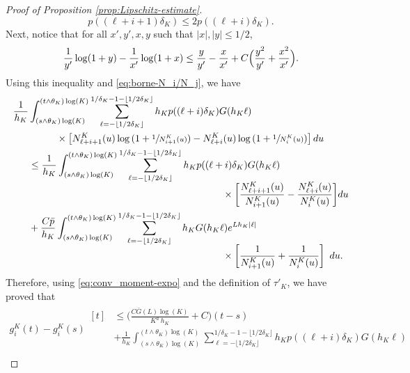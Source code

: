 \documentclass[JEP,XML,SOM,Unicode,published]{cedram}
\theoremstyle{plain}
\theoremstyle{remark}
\begin{document}
\begin{proof}[Proof of Proposition \ref{prop:Lipschitz-estimate}]
\[
p((\ell+i+1)\delta_K)\leq 2p((\ell+i)\delta_K).
\]
Next, notice that for all {$x',y',x,y$ such that $|x|,|y|\leq 1/2$,\vspace*{-3pt}
\begin{equation*}%
{1 \over y'}\log(1+{ y}) -{ 1\over x'}\log(1+{ x}) \le {y\over y'} - {x\over x'} + C\Big({y^2\over y'}+{x^2\over x'}\Big).
\end{equation*}
Using this inequality and \eqref{eq:borne-N_i/N_j}, we have\vspace*{-3pt}
\begin{align*}
\frac{1}{h_K} & \int_{(s\wedge\theta_K)\log(K)}^{(t\wedge\theta_K)\log(K)} \sum_{\ell=-\lfloor 1/2\delta_K\rfloor}^{1/\delta_K-1-\lfloor 1/2\delta_K\rfloor} h_{K} p((\ell+i)\delta_K) G(h_{K}\ell)\\
& \hspace{1cm} \times \left[N_{\ell+i+1}^K(u)\log \left(1+\sfrac{1}{N_{i+1}^K(u)}\right)-N_{\ell+i}^K(u)\log \left(1+\sfrac{1}{N_{i}^K(u)}\right)
\right]du \\
& \leq \frac{1}{h_K}\int_{(s\wedge\theta_K)\log(K)}^{(t\wedge\theta_K)\log(K)} \sum_{\ell=-\lfloor 1/2\delta_K\rfloor}^{1/\delta_K-1-\lfloor 1/2\delta_K\rfloor} h_Kp((\ell+i)\delta_K)G(h_K\ell)\\[-5pt]
& \hspace{7cm} \times \biggl[\frac{N_{\ell+i+1}^K(u)}{N_{i+1}^K(u)}-\frac{N_{\ell+i}^K(u)}{N_{i}^K(u)}
\biggr]du \\
& +\frac{C\bar p}{h_K}\int_{(s\wedge\theta_K)\log(K)}^{(t\wedge\theta_K)\log(K)} \sum_{\ell=-\lfloor 1/2\delta_K\rfloor}^{1/\delta_K-1-\lfloor 1/2\delta_K\rfloor} h_KG(h_K\ell)e^{Lh_K|\ell|}\\[-5pt]
& \hspace{7cm} \times \left[\frac{1}{N_{i+1}^K(u)}+\frac{1}{N_{i}^K(u)}\right]\ du.
\end{align*}
Therefore, using \eqref{eq:conv_moment-expo} and the definition of $\tau'_K$, we have proved that\vspace*{-.5\baselineskip}\enlargethispage{\baselineskip}
\begin{multline*}
g^K_{i}(t) - g^K_{i}(s)
\begin{aligned}[t]
& \leq \biggl(\frac{C\bar G(L)\log(K)}{ K^a \ h_K}+C\biggr)(t-s) \\
& +\frac{1}{h_K}\int_{(s\wedge\theta_K)\log(K)}^{(t\wedge\theta_K)\log(K)} \sum_{\ell=-\lfloor 1/2\delta_K\rfloor}^{1/\delta_K-1-\lfloor 1/2\delta_K\rfloor} h_Kp((\ell+i)\delta_K)G(h_K\ell)\\

\end{aligned}
\end{multline*}}
\end{proof}
\end{document}
